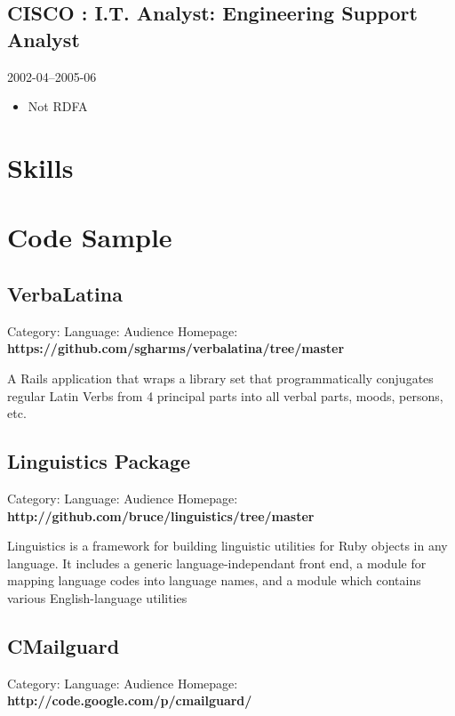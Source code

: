 \documentclass[]{article}
\begin{document}
\subsection*{CISCO : I.T. Analyst: Engineering Support Analyst}
  \label{cisco_rdfa_cisco_2_title:_rdfa_cisco_2_desc}
  2002-04--2005-06
\begin{itemize}
    \item Not RDFA
\end{itemize}
       


\section{Skills}










  \section*{ Code Sample }





\subsection*{VerbaLatina}
Category:  Language: Audience
Homepage: {\bf https://github.com/sgharms/verbalatina/tree/master}

A Rails application that wraps a library set that programmatically conjugates regular Latin Verbs from 4 principal parts into all verbal parts, moods, persons, etc.




\subsection*{Linguistics Package}
Category:  Language: Audience
Homepage: {\bf http://github.com/bruce/linguistics/tree/master}

Linguistics is a framework for building linguistic utilities for Ruby objects
in any language. It includes a generic language-independant front end, a
module for mapping language codes into language names, and a module which
contains various English-language utilities





\subsection*{CMailguard}
Category:  Language: Audience
Homepage: {\bf http://code.google.com/p/cmailguard/}
\end{document}
